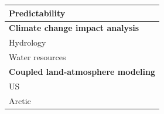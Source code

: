 \documentclass[gmd, manuscript]{copernicus}
\begin{document}
\begin{landscape}
\begin{table}[]
{\begin{tabular}{l|l|}
    \multicolumn{1}{|l|}{Predictability}          & \citet{Gebregiorgis_2011,Maurer_2003}  \\ \hline
    \multicolumn{2}{|l|}{\textbf{Climate change impact analysis}}  \\ \hline
    \multicolumn{1}{|l|}{Hydrology}               & \citet{Barnett_2005,Beyene_2010,Nijssen_2001b,Schewe_2014}  \\ \hline
    \multicolumn{1}{|l|}{Water resources}         & \citet{Christensen_2007,Das_2011,Hamlet_1999}  \\ \hline
    \multicolumn{2}{|l|}{\textbf{Coupled land-atmosphere modeling}}  \\ \hline
    \multicolumn{1}{|l|}{US}                      & \citet{Zhu_2009}  \\ \hline
    \multicolumn{1}{|l|}{Arctic}                  & \citet{Hamman_2016a} \\ \hline
  \end{tabular}
  }
\end{table}
\end{landscape}
\end{document}
